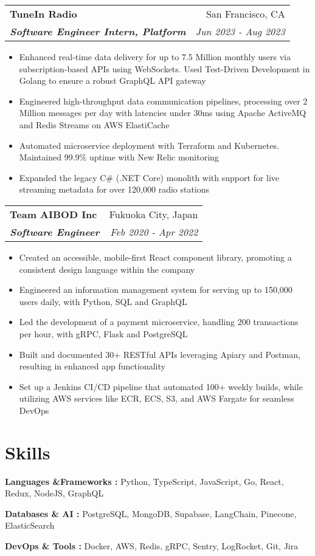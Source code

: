 \documentclass[letterpaper]{article}
\makeatletter
\newcommand{\resumeItemWithoutTitle}[1]{
  \item\small{
    {#1 \vspace{0pt}}
  }
}
\newcommand{\resumeSubheading}[4]{
    \begin{tabular*}{\textwidth}{l@{\extracolsep{\fill}}r}
        \textbf{#1} & #2 \\
        \textbf{\textit{#3}} & \textit{\small #4} \\
    \end{tabular*}\vspace{0pt}
}
\newcommand{\shortSection}[1]{
    \vspace{-6pt}
    \section{#1}
}
\newcommand*{\skill}[2]{
  \textbf{#1 : }#2 \\
  \vspace{1pt}
}
\newcommand{\resumeItemListStart}{\begin{itemize}}
\newcommand{\resumeItemListEnd}{\end{itemize}}
\makeatother
\begin{document}
\vspace{3pt}
\resumeSubheading
{TuneIn Radio}{San Francisco, CA}
{Software Engineer Intern, Platform}{Jun 2023 - Aug 2023}
\resumeItemListStart
\resumeItemWithoutTitle{Enhanced real-time data delivery for up to 7.5 Million monthly users via subscription-based APIs using WebSockets. Used Test-Driven Development in Golang to ensure a robust GraphQL API gateway}
\resumeItemWithoutTitle{Engineered high-throughput data communication pipelines, processing over 2 Million messages per day with latencies under 30ms using Apache ActiveMQ and Redis Streams on AWS ElastiCache}
\resumeItemWithoutTitle{Automated microservice deployment with Terraform and Kubernetes. Maintained 99.9\% uptime with New Relic monitoring}
\resumeItemWithoutTitle{Expanded the legacy C\# (.NET Core) monolith with support for live streaming metadata for over 120,000 radio stations}
\resumeItemListEnd

\vspace{3pt}
\resumeSubheading
{Team AIBOD Inc}{Fukuoka City, Japan}
{Software Engineer}{Feb 2020 - Apr 2022}
\resumeItemListStart
\resumeItemWithoutTitle{Created an accessible, mobile-first React component library, promoting a consistent design language within the company}
\resumeItemWithoutTitle{Engineered an information management system for serving up to 150,000 users daily,  with Python, SQL and GraphQL}
\resumeItemWithoutTitle{Led the development of a payment microservice, handling 200 transactions per hour, with gRPC, Flask and PostgreSQL}
\resumeItemWithoutTitle{Built and documented 30+ RESTful APIs leveraging Apiary and Postman, resulting in enhanced app functionality}
\resumeItemWithoutTitle{Set up a Jenkins CI/CD pipeline that automated 100+ weekly builds, while utilizing AWS services like ECR, ECS, S3, and AWS Fargate for seamless DevOps}
\resumeItemListEnd



\shortSection{Skills}
\vspace{3pt}
\skill {Languages \&Frameworks}{Python, TypeScript, JavaScript, Go, React, Redux, NodeJS, GraphQL}
\skill {Databases \& AI}{PostgreSQL, MongoDB, Supabase, LangChain, Pinecone, ElasticSearch}
\skill {DevOps \& Tools}{Docker, AWS, Redis, gRPC, Sentry, LogRocket, Git, Jira}
\end{document}
